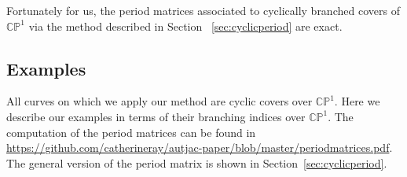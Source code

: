\documentclass[12pt,reqno]{amsart}
\newcommand{\C}{\mathbb{C}}
\renewcommand{\P}{\mathbb{P}}
\theoremstyle{definition}
\theoremstyle{remark}
\begin{document}
Fortunately for us, the period matrices associated to cyclically branched covers of $\C\P^1$ via the method described in Section ~\ref{sec:cyclicperiod} are exact. 

\subsection{Examples}
\label{sec:examples}

All curves on which we apply our method are cyclic covers over $\C\P^1.$ Here we describe our examples in terms of their branching indices over $\C\P^1.$ The computation of the period matrices can be found in \url{https://github.com/catherineray/autjac-paper/blob/master/periodmatrices.pdf}. The general version of the period matrix is shown in Section~\ref{sec:cyclicperiod}.
\end{document}

